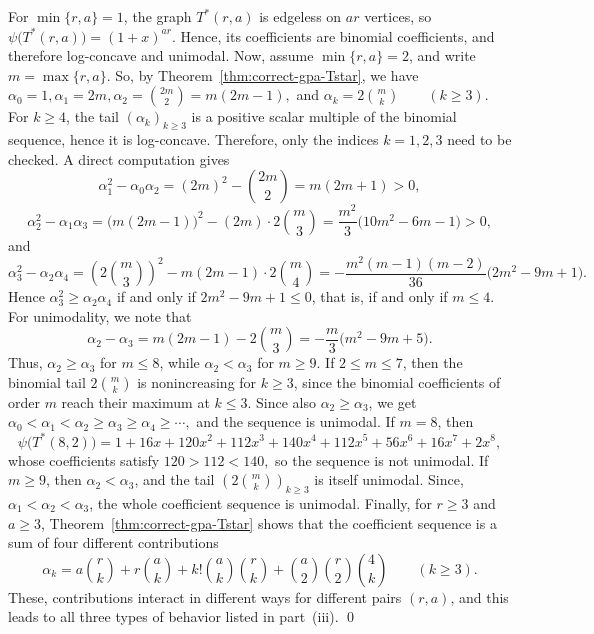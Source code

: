 \documentclass[12pt,twoside]{article}
\renewenvironment{proof}{{\noindent\bfseries Proof.}}{\qed}
\begin{document}
		\begin{proof}
			For $\min\{r,a\}=1$, the graph $T^*(r,a)$ is edgeless on $ar$ vertices, so $\psi\bigl(T^*(r,a)\bigr)=(1+x)^{ar}.$
			Hence, its coefficients are binomial coefficients, and therefore log-concave and unimodal. Now, assume $\min\{r,a\}=2$, and write $m=\max\{r,a\}$. So, by Theorem~\ref{thm:correct-gpa-Tstar}, we have
			$\alpha_0=1, \alpha_1=2m, \alpha_2=\binom{2m}{2}=m(2m-1),$	and $\alpha_k=2\binom{m}{k}\qquad (k\ge 3).$  For $k\ge 4$, the tail $(\alpha_k)_{k\ge 3}$ is a positive scalar multiple of the binomial sequence, hence it is log-concave. Therefore, only the indices $k=1,2,3$ need to be checked. A direct computation gives
			$$
			\alpha_1^2-\alpha_0\alpha_2
			=
			(2m)^2-\binom{2m}{2}
			=
			m(2m+1)>0,
			$$
			$$
			\alpha_2^2-\alpha_1\alpha_3
			=
			\bigl(m(2m-1)\bigr)^2-(2m)\cdot 2\binom{m}{3}
			=
			\frac{m^2}{3}\bigl(10m^2-6m-1\bigr)>0,
			$$
			and
			$$
			\alpha_3^2-\alpha_2\alpha_4
			=
			\left(2\binom{m}{3}\right)^2-m(2m-1)\cdot 2\binom{m}{4}
			=
			-\frac{m^2(m-1)(m-2)}{36}\bigl(2m^2-9m+1\bigr).
			$$
			Hence $\alpha_3^2\ge \alpha_2\alpha_4$ if and only if $2m^2-9m+1\le 0$, that is, if and only if $m\le 4$.  For unimodality, we note that 
			$$
			\alpha_2-\alpha_3
			=
			m(2m-1)-2\binom{m}{3}
			=
			-\frac{m}{3}\bigl(m^2-9m+5\bigr).
			$$
			Thus, $\alpha_2\ge \alpha_3$ for $m\le 8$, while $\alpha_2<\alpha_3$ for $m\ge 9$. If $2\le m\le 7$, then the binomial tail $2\binom{m}{k}$ is nonincreasing for $k\ge 3$, since the binomial coefficients of order $m$ reach their maximum at $k\le 3$. Since also $\alpha_2\ge \alpha_3$, we get $	\alpha_0<\alpha_1<\alpha_2\ge \alpha_3\ge \alpha_4\ge \cdots,
			$ and the sequence is unimodal. If $m=8$, then
			$$
			\psi\bigl(T^*(8,2)\bigr)=1+16x+120x^2+112x^3+140x^4+112x^5+56x^6+16x^7+2x^8,
			$$
			whose coefficients satisfy $120>112<140,$ so the sequence is not unimodal. If $m\ge 9$, then $\alpha_2<\alpha_3$, and the tail $(2\binom{m}{k})_{k\ge 3}$ is itself unimodal. Since, $\alpha_1<\alpha_2<\alpha_3$, the whole coefficient sequence is unimodal.  Finally, for $r\ge 3$ and $a\ge 3$,  Theorem~\ref{thm:correct-gpa-Tstar} shows that the coefficient sequence is a sum of four different contributions 
			$$
			\alpha_k
			=
			a\binom{r}{k}
			+
			r\binom{a}{k}
			+
			k!\binom{a}{k}\binom{r}{k}
			+
			\binom{a}{2}\binom{r}{2}\binom{4}{k}
			\qquad (k\ge 3).
			$$
			These, contributions interact in different ways for different pairs $(r,a)$, and this leads to all three types of behavior listed in part~(iii). 
		\end{proof}
		
\end{document}
